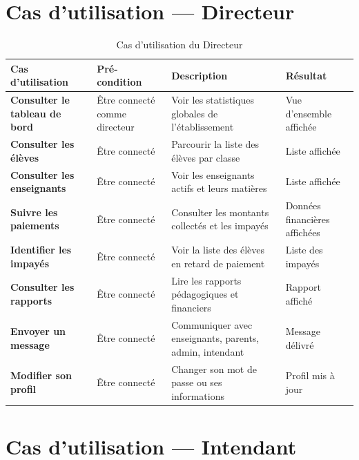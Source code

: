 \documentclass[12pt, a4paper, twoside, openright]{report}
\begin{document}
\section{Cas d'utilisation — Directeur}

\begin{table}[htbp]
  \centering
  \caption{Cas d'utilisation du Directeur}
  \small
  \begin{tabularx}{\textwidth}{>{\bfseries}p{3.5cm} p{3cm} X p{2.5cm}}
    \toprule
    \textbf{Cas d'utilisation} & \textbf{Pré-condition} & \textbf{Description} & \textbf{Résultat} \\
    \midrule
    Consulter le tableau de bord & Être connecté comme directeur & Voir les statistiques globales de l'établissement & Vue d'ensemble affichée \\
    Consulter les élèves & Être connecté & Parcourir la liste des élèves par classe & Liste affichée \\
    Consulter les enseignants & Être connecté & Voir les enseignants actifs et leurs matières & Liste affichée \\
    Suivre les paiements & Être connecté & Consulter les montants collectés et les impayés & Données financières affichées \\
    Identifier les impayés & Être connecté & Voir la liste des élèves en retard de paiement & Liste des impayés \\
    Consulter les rapports & Être connecté & Lire les rapports pédagogiques et financiers & Rapport affiché \\
    Envoyer un message & Être connecté & Communiquer avec enseignants, parents, admin, intendant & Message délivré \\
    Modifier son profil & Être connecté & Changer son mot de passe ou ses informations & Profil mis à jour \\
    \bottomrule
  \end{tabularx}
\end{table}

\section{Cas d'utilisation — Intendant}
\end{document}
